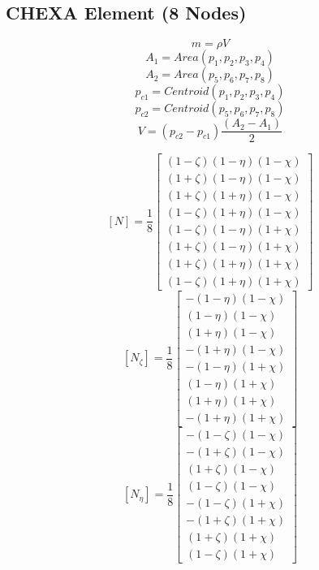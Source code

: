 \documentclass[a4paper,12pt]{article}
\begin{document}
   \subsection{CHEXA Element (8 Nodes)}
     \[ m = \rho V \]
     \[ A_1 = Area(p_1, p_2, p_3, p_4) \]
     \[ A_2 = Area(p_5, p_6, p_7, p_8) \]
     \[ p_{c1} = Centroid(p_1, p_2 ,p_3, p_4) \]
     \[ p_{c2} = Centroid(p_5, p_6 ,p_7, p_8) \]
     \[ V = (p_{c2}-p_{c1}) \frac{(A_2 - A_1)}{2} \]

    \[ [N] = \frac{1}{8} \left[ \begin{array}{c}
               (1-\zeta)(1-\eta)(1-\chi) \\
               (1+\zeta)(1-\eta)(1-\chi) \\
               (1+\zeta)(1+\eta)(1-\chi) \\
               (1-\zeta)(1+\eta)(1-\chi) \\
               (1-\zeta)(1-\eta)(1+\chi) \\
               (1+\zeta)(1-\eta)(1+\chi) \\
               (1+\zeta)(1+\eta)(1+\chi) \\
               (1-\zeta)(1+\eta)(1+\chi)
            \end{array}\right]\]
    \[ [N_\zeta] = \frac{1}{8} \left[ \begin{array}{c}
               -(1-\eta)(1-\chi) \\
                (1-\eta)(1-\chi) \\
                (1+\eta)(1-\chi) \\
               -(1+\eta)(1-\chi) \\
               -(1-\eta)(1+\chi) \\
                (1-\eta)(1+\chi) \\
                (1+\eta)(1+\chi) \\
               -(1+\eta)(1+\chi)
            \end{array}\right]\]
    \[ [N_\eta] = \frac{1}{8} \left[ \begin{array}{c}
               -(1-\zeta)(1-\chi) \\
               -(1+\zeta)(1-\chi) \\
                (1+\zeta)(1-\chi) \\
                (1-\zeta)(1-\chi) \\
               -(1-\zeta)(1+\chi) \\
               -(1+\zeta)(1+\chi) \\
                (1+\zeta)(1+\chi) \\
                (1-\zeta)(1+\chi)
            \end{array}\right]\]
\end{document}

